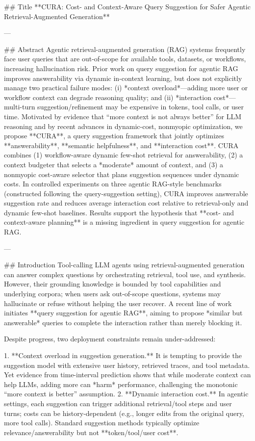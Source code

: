 ## Title  
**CURA: Cost- and Context-Aware Query Suggestion for Safer Agentic Retrieval-Augmented Generation**

---

## Abstract  
Agentic retrieval-augmented generation (RAG) systems frequently face user queries that are out-of-scope for available tools, datasets, or workflows, increasing hallucination risk. Prior work on query suggestion for agentic RAG improves answerability via dynamic in-context learning, but does not explicitly manage two practical failure modes: (i) *context overload*—adding more user or workflow context can degrade reasoning quality; and (ii) *interaction cost*—multi-turn suggestion/refinement may be expensive in tokens, tool calls, or user time. Motivated by evidence that “more context is not always better” for LLM reasoning and by recent advances in dynamic-cost, nonmyopic optimization, we propose **CURA**, a query suggestion framework that jointly optimizes **answerability**, **semantic helpfulness**, and **interaction cost**. CURA combines (1) workflow-aware dynamic few-shot retrieval for answerability, (2) a context budgeter that selects a *moderate* amount of context, and (3) a nonmyopic cost-aware selector that plans suggestion sequences under dynamic costs. In controlled experiments on three agentic RAG-style benchmarks (constructed following the query-suggestion setting), CURA improves answerable suggestion rate and reduces average interaction cost relative to retrieval-only and dynamic few-shot baselines. Results support the hypothesis that **cost- and context-aware planning** is a missing ingredient in query suggestion for agentic RAG.

---

## Introduction  
Tool-calling LLM agents using retrieval-augmented generation can answer complex questions by orchestrating retrieval, tool use, and synthesis. However, their grounding knowledge is bounded by tool capabilities and underlying corpora; when users ask out-of-scope questions, systems may hallucinate or refuse without helping the user recover. A recent line of work initiates **query suggestion for agentic RAG**, aiming to propose *similar but answerable* queries to complete the interaction rather than merely blocking it.

Despite progress, two deployment constraints remain under-addressed:

1. **Context overload in suggestion generation.** It is tempting to provide the suggestion model with extensive user history, retrieved traces, and tool metadata. Yet evidence from time-interval prediction shows that while moderate context can help LLMs, adding more can *harm* performance, challenging the monotonic “more context is better” assumption.  
2. **Dynamic interaction cost.** In agentic settings, each suggestion can trigger additional retrieval/tool steps and user turns; costs can be history-dependent (e.g., longer edits from the original query, more tool calls). Standard suggestion methods typically optimize relevance/answerability but not **token/tool/user cost**.

